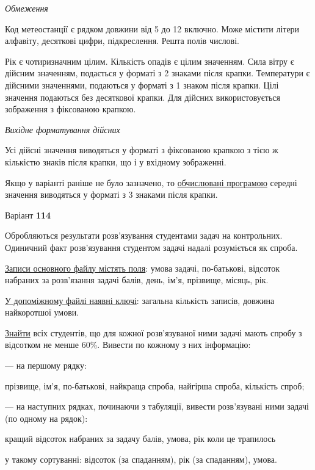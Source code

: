\documentclass[11pt, ukrainian]{article}
\begin{document}
\bigskip\textit{Обмеження}

Код метеостанції є рядком довжини від 5 до 12 включно.
Може містити літери алфавіту, десяткові цифри, підкреслення. Решта полів числові.

Рік є чотиризначним цілим.
Кількість опадів є цілим значенням.
Сила вітру є дійсним значенням, подається у форматі з 2 знаками після крапки.
Температури є дійсними значеннями, подаються у форматі з 1 знаком після крапки.
Цілі значення подаються без десяткової крапки.
Для дійсних використовується зображення з фіксованою крапкою.

\textit{Вихідне форматування дійсних}

Усі дійсні значення виводяться у форматі з фіксованою крапкою з тією ж кількістю знаків після крапки, що і у вхідному зображенні.

Якщо у варіанті раніше не було зазначено, то \underline{обчислювані програмою} середні значення виводяться у форматі з 3 знаками після крапки.




\par
\newpage
{\center Варіант  \No \textbf { 114 }\par}
\bigskip
Обробляються результати розв’язування студентами задач на контрольних.
Одиничний факт роз\-в’я\-зу\-вання студентом задачі надалі розуміється як спроба.

\underline{Записи основного файлу містять поля}: умова задачі, по-батькові, відсоток набраних за розв’язання задачі балів, день, ім’я, прізвище, місяць, рік.

\underline{У допоміжному файлі наявні ключі}: загальна кількість записів, довжина найкоротшої умови.

\underline{Знайти} всіх студентів, що для кожної розв'язуваної ними задачі мають спробу з відсотком не менше 60\%. Вивести по кожному з них інформацію:\par
{\noindent}--- на першому рядку:\par
прізвище, ім’я, по-батькові, найкраща спроба, найгірша спроба, кількість спроб;

{\noindent}--- на наступних рядках, починаючи з табуляції, вивести розв'язувані ними задачі (по одному на рядок):\par
кращий відсоток набраних за задачу балів, умова, рік коли це трапилось

{\noindent}у такому сортуванні: відсоток (за спаданням), рік (за спаданням), умова.
\end{document}
